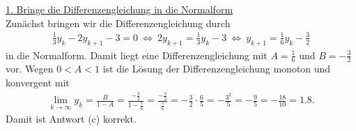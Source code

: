 \underline{1. Bringe die Differenzengleichung in die Normalform}\\
Zunächst bringen wir die Differenzengleichung durch
\begin{align*}
	\frac{1}{3} y_k
	-
	2 y_{k+1}
	-3
	=0
	\ \Leftrightarrow \
	2 y_{k+1} 
	= 
	\frac{1}{3} y_k
	-3
	\ \Leftrightarrow \
	 y_{k+1} 
	= 
	\frac{1}{6} y_k
	-\frac{3}{2}
\end{align*}
in die Normalform. Damit liegt eine Differenzengleichung mit $A = \frac{1}{6}$ und $B = - \frac{3}{2}$ vor.
Wegen $0 < A < 1$ ist die Lösung der Differenzengleichung monoton und konvergent mit
\begin{align*}
	\lim \limits_{k \to \infty}
	y_k
	= 
	\frac{B}{1 -A} 
	=
	\frac{- \frac{3}{2}}{1 - \frac{1}{6}}
	=
	\frac{-\frac{3}{2}}{\frac{5}{6}}
	=
	- \frac{3}{2} \cdot \frac{6}{5}
	= 
	- \frac{3^2}{5}
	= 
	- \frac{9}{5} = - \frac{18}{10} = 1.8.
\end{align*}
Damit ist Antwort (c) korrekt.